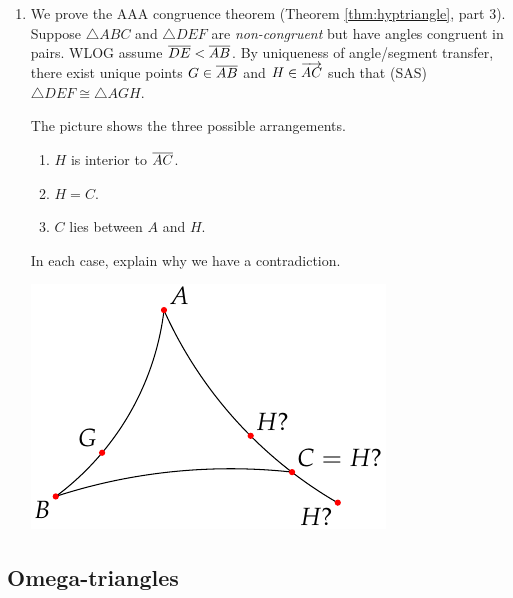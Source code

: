 \begin{exercises}
\begin{enumerate}
  
  \item We prove the AAA congruence theorem (Theorem \ref{thm:hyptriangle}, part 3).\smallbreak
  Suppose $\triangle ABC$ and $\triangle DEF$ are \emph{non-congruent} but have angles congruent in pairs. WLOG assume $\overline{DE}<\overline{AB}$. By uniqueness of angle/segment transfer, there exist unique points $G\in\overline{AB}$ and $H\in\overrightarrow{AC}$ such that (SAS) $\triangle DEF\cong\triangle AGH$.\par
  \begin{minipage}[t]{0.6\linewidth}\vspace{-5pt}
  	The picture shows the three possible arrangements.
  	\begin{enumerate}\itemsep0pt
    	\item $H$ is interior to $\overline{AC}$.
    	\item $H=C$.
    	\item $C$ lies between $A$ and $H$.
  	\end{enumerate}
  	In each case, explain why we have a contradiction.
   \end{minipage}\hfill\begin{minipage}[t]{0.39\linewidth}\vspace{-25pt}
    \flushright\includegraphics{basic-aaa}
   \end{minipage}
\end{enumerate}
\end{exercises}


\clearpage


\subsection{Omega-triangles}

